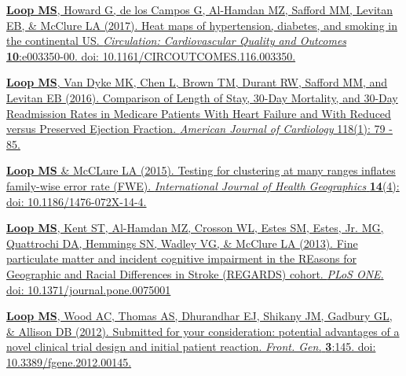\documentclass[10pt,letterpaper]{article}
\begin{document}
\begin{etaremune}
\item \href{http://circoutcomes.ahajournals.org/content/10/1/e003350.full?ijkey=Tq0l4EAFSjOGzX7\&keytype=ref}{\textbf{Loop MS}, Howard G, de los Campos G, Al-Hamdan MZ, Safford MM, Levitan EB, \& McClure LA (2017). Heat maps of hypertension, diabetes, and smoking in the continental US. \emph{Circulation: Cardiovascular Quality and Outcomes} \textbf{10}:e003350-00. doi: 10.1161/CIRCOUTCOMES.116.003350.}

\item \href{http://www.sciencedirect.com/science/article/pii/S0002914916304969}{\textbf{Loop MS}, Van Dyke MK, Chen L, Brown TM, Durant RW, Safford MM, and Levitan EB (2016). Comparison of Length of Stay, 30-Day Mortality, and 30-Day Readmission Rates in Medicare Patients With Heart Failure and With Reduced versus Preserved Ejection Fraction. \emph{American Journal of Cardiology} 118(1): 79 - 85.}

\item \href{http://www.ij-healthgeographics.com/content/14/1/4}{\textbf{Loop MS} \& McCLure LA (2015). Testing for clustering at many ranges inflates family-wise error rate (FWE). \emph{International Journal of Health Geographics} \textbf{14}(4): doi: 10.1186/1476-072X-14-4.}

\item \href{http://www.plosone.org/article/info\%3Adoi\%2F10.1371\%2Fjournal.pone.0075001#references}{\textbf{Loop MS}, Kent ST, Al-Hamdan MZ, Crosson WL, Estes SM, Estes, Jr. MG, Quattrochi DA, Hemmings SN, Wadley VG, \& McClure LA (2013). Fine particulate matter and incident cognitive impairment in the REasons for Geographic and Racial Differences in Stroke (REGARDS) cohort. \emph{PLoS ONE}. doi: 10.1371/journal.pone.0075001}

\item \href{http://www.frontiersin.org/Pharmacogenetics_and_Pharmacogenomics/10.3389/fgene.2012.00145/abstract}{\textbf{Loop MS}, Wood AC, Thomas AS, Dhurandhar EJ, Shikany JM, Gadbury GL, \& Allison DB (2012). Submitted for your consideration: potential advantages of a novel clinical trial design and initial patient reaction. \emph{Front. Gen.} \textbf{3}:145. doi: 10.3389/fgene.2012.00145.}
\end{etaremune}

\end{document}
